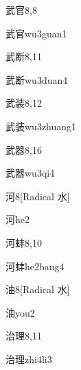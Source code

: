 \begin{entry}{武官}{8,8}
  \begin{phonetics}{武官}{wu3guan1}
  \end{phonetics}
\end{entry}

\begin{entry}{武断}{8,11}
  \begin{phonetics}{武断}{wu3duan4}
  \end{phonetics}
\end{entry}

\begin{entry}{武装}{8,12}
  \begin{phonetics}{武装}{wu3zhuang1}
  \end{phonetics}
\end{entry}

\begin{entry}{武器}{8,16}
  \begin{phonetics}{武器}{wu3qi4}
  \end{phonetics}
\end{entry}

\begin{entry}{河}{8}[Radical 水]
  \begin{phonetics}{河}{he2}
  \end{phonetics}
\end{entry}

\begin{entry}{河蚌}{8,10}
  \begin{phonetics}{河蚌}{he2bang4}
  \end{phonetics}
\end{entry}

\begin{entry}{油}{8}[Radical 水]
  \begin{phonetics}{油}{you2}
  \end{phonetics}
\end{entry}

\begin{entry}{治理}{8,11}
  \begin{phonetics}{治理}{zhi4li3}
  \end{phonetics}
\end{entry}

